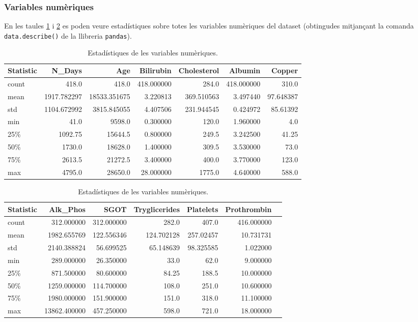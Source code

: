 \subsubsection{Variables numèriques}
En les taules \ref{tab:num-stats-1} i \ref{tab:num-stats-2} es poden veure estadístiques sobre totes les variables numèriques del dataset (obtingudes mitjançant la comanda \texttt{data.describe()} de la llibreria \texttt{pandas}).

\begin{table}[ht]
\centering
\begin{tabular}{lrrrrrr}
\hline
\textbf{Statistic} & \textbf{N\_Days} & \textbf{Age} & \textbf{Bilirubin} & \textbf{Cholesterol} & \textbf{Albumin} & \textbf{Copper} \\ 
\hline
count & 418.0 & 418.0 & 418.000000 & 284.0 & 418.000000 & 310.0 \\ 
mean & 1917.782297 & 18533.351675 & 3.220813 & 369.510563 & 3.497440 & 97.648387 \\ 
std & 1104.672992 & 3815.845055 & 4.407506 & 231.944545 & 0.424972 & 85.61392 \\ 
min & 41.0 & 9598.0 & 0.300000 & 120.0 & 1.960000 & 4.0 \\ 
25\% & 1092.75 & 15644.5 & 0.800000 & 249.5 & 3.242500 & 41.25 \\ 
50\% & 1730.0 & 18628.0 & 1.400000 & 309.5 & 3.530000 & 73.0 \\ 
75\% & 2613.5 & 21272.5 & 3.400000 & 400.0 & 3.770000 & 123.0 \\ 
max & 4795.0 & 28650.0 & 28.000000 & 1775.0 & 4.640000 & 588.0 \\
\hline
\end{tabular}
\caption{Estadístiques de les variables numèriques.}
\label{tab:num-stats-1}
\end{table}

\begin{table}[ht]
\centering
\begin{tabular}{lrrrrrr}
\hline
\textbf{Statistic} & \textbf{Alk\_Phos} & \textbf{SGOT} & \textbf{Tryglicerides} & \textbf{Platelets} & \textbf{Prothrombin} \\ 
\hline
count & 312.000000 & 312.000000 & 282.0 & 407.0 & 416.000000 \\ 
mean & 1982.655769 & 122.556346 & 124.702128 & 257.02457 & 10.731731 \\ 
std & 2140.388824 & 56.699525 & 65.148639 & 98.325585 & 1.022000 \\ 
min & 289.000000 & 26.350000 & 33.0 & 62.0 & 9.000000 \\ 
25\% & 871.500000 & 80.600000 & 84.25 & 188.5 & 10.000000 \\ 
50\% & 1259.000000 & 114.700000 & 108.0 & 251.0 & 10.600000 \\ 
75\% & 1980.000000 & 151.900000 & 151.0 & 318.0 & 11.100000 \\ 
max & 13862.400000 & 457.250000 & 598.0 & 721.0 & 18.000000 \\
\hline
\end{tabular}
\caption{Estadístiques de les variables numèriques.}
\label{tab:num-stats-2}
\end{table}


